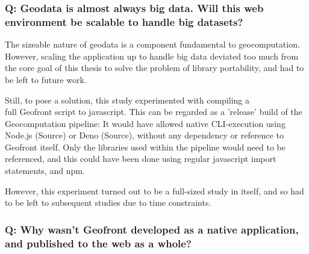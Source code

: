 \subsubsection*{Q: Geodata is almost always big data. Will this web environment be scalable to handle big datasets?}



The sizeable nature of geodata is a component fundamental to geocomputation.
However, scaling the application up to handle big data deviated too much from the core goal of this thesis to solve the problem of library portability, and had to be left to future work. 

Still, to pose a solution, this study experimented with compiling a \\ full Geofront script to javascript.
This can be regarded as a 'release' build of the Geocomputation pipeline: 
It would have allowed native CLI-execution using Node.js (Source) or Deno (Source), without any dependency or reference to Geofront itself.
Only the libraries used within the pipeline would need to be referenced, and this could have been done using regular javascript import statements, and npm.

However, this experiment turned out to be a full-sized study in itself, and so had to be left to subsequent studies due to time constraints. 

\subsubsection*{Q: Why wasn't Geofront developed as a native application, and published to the web as a whole?}

